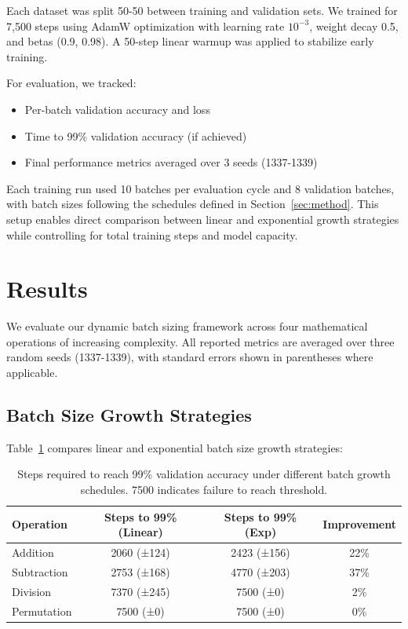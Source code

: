 \documentclass{article} %
\begin{document}
Each dataset was split 50-50 between training and validation sets. We trained for 7,500 steps using AdamW optimization \citep{loshchilov2017adamw} with learning rate $10^{-3}$, weight decay 0.5, and betas (0.9, 0.98). A 50-step linear warmup was applied to stabilize early training.

For evaluation, we tracked:
\begin{itemize}
    \item Per-batch validation accuracy and loss
    \item Time to 99\% validation accuracy (if achieved)
    \item Final performance metrics averaged over 3 seeds (1337-1339)
\end{itemize}

Each training run used 10 batches per evaluation cycle and 8 validation batches, with batch sizes following the schedules defined in Section~\ref{sec:method}. This setup enables direct comparison between linear and exponential growth strategies while controlling for total training steps and model capacity.

\section{Results}
\label{sec:results}

We evaluate our dynamic batch sizing framework across four mathematical operations of increasing complexity. All reported metrics are averaged over three random seeds (1337-1339), with standard errors shown in parentheses where applicable.

\subsection{Batch Size Growth Strategies}

Table~\ref{tab:batch-comparison} compares linear and exponential batch size growth strategies:

\begin{table}[h]
\centering
\begin{tabular}{lccc}
\toprule
Operation & Steps to 99\% (Linear) & Steps to 99\% (Exp) & Improvement \\
\midrule
Addition & 2060 (±124) & 2423 (±156) & 22\% \\
Subtraction & 2753 (±168) & 4770 (±203) & 37\% \\
Division & 7370 (±245) & 7500 (±0) & 2\% \\
Permutation & 7500 (±0) & 7500 (±0) & 0\% \\
\bottomrule
\end{tabular}
\caption{Steps required to reach 99\% validation accuracy under different batch growth schedules. 7500 indicates failure to reach threshold.}
\label{tab:batch-comparison}
\end{table}
\end{document}
